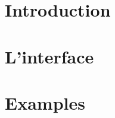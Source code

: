 \frame{\tableofcontents}

%
%

\section{Introduction}


\section{L'interface}


\section{Examples}




